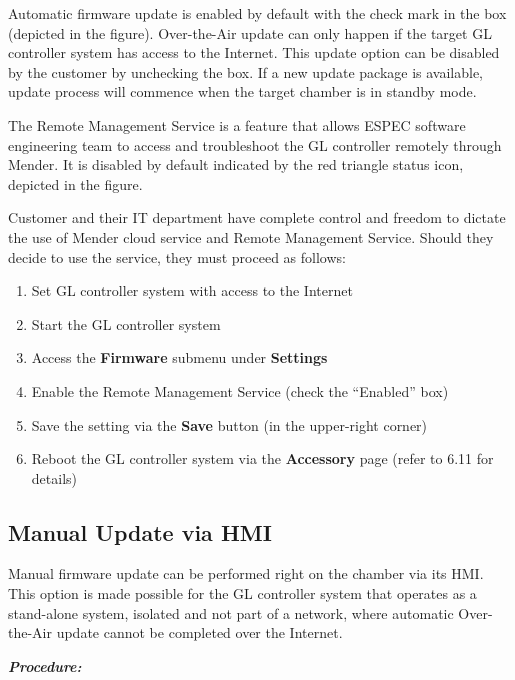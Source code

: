 Automatic firmware update is enabled by default with the check mark in
the box (depicted in the figure). Over-the-Air update can only happen if
the target GL controller system has access to the Internet. This update
option can be disabled by the customer by unchecking the box. If a new
update package is available, update process will commence when the
target chamber is in standby mode.

The Remote Management Service is a feature that allows ESPEC software
engineering team to access and troubleshoot the GL controller remotely
through Mender. It is disabled by default indicated by the red triangle
status icon, depicted in the figure.

Customer and their IT department have complete control and freedom to
dictate the use of Mender cloud service and Remote Management Service.
Should they decide to use the service, they must proceed as follows:

\begin{enumerate}
\def\labelenumi{\arabic{enumi}.}
\tightlist
\item
  Set GL controller system with access to the Internet
\item
  Start the GL controller system
\item
  Access the \textbf{Firmware} submenu under \textbf{Settings}
\item
  Enable the Remote Management Service (check the ``Enabled'' box)
\item
  Save the setting via the \textbf{Save} button (in the upper-right
  corner)
\item
  Reboot the GL controller system via the \textbf{Accessory} page (refer
  to 6.11 for details)
\end{enumerate}


\subsection{Manual Update via
HMI}

Manual firmware update can be performed right on the chamber via its
HMI. This option is made possible for the GL controller system that
operates as a stand-alone system, isolated and not part of a network,
where automatic Over-the-Air update cannot be completed over the
Internet.

\textbf{\emph{Procedure:}}

